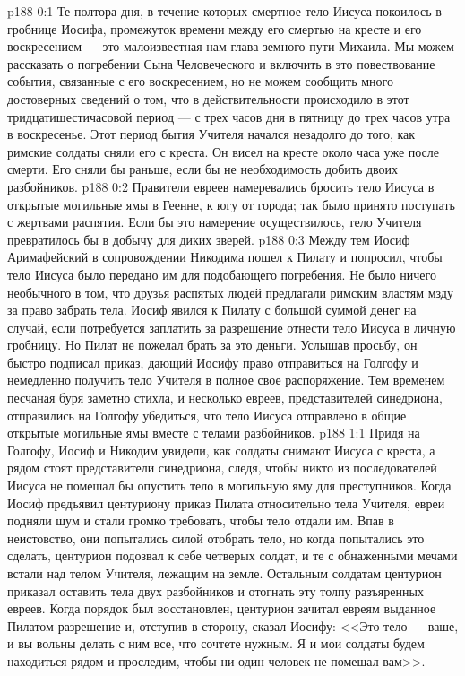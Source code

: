 \vs p188 0:1 Те полтора дня, в течение которых смертное тело Иисуса покоилось в гробнице Иосифа, промежуток времени между его смертью на кресте и его воскресением --- это малоизвестная нам глава земного пути Михаила. Мы можем рассказать о погребении Сына Человеческого и включить в это повествование события, связанные с его воскресением, но не можем сообщить много достоверных сведений о том, что в действительности происходило в этот тридцатишестичасовой период --- с трех часов дня в пятницу до трех часов утра в воскресенье. Этот период бытия Учителя начался незадолго до того, как римские солдаты сняли его с креста. Он висел на кресте около часа уже после смерти. Его сняли бы раньше, если бы не необходимость добить двоих разбойников.
\vs p188 0:2 Правители евреев намеревались бросить тело Иисуса в открытые могильные ямы в Геенне, к югу от города; так было принято поступать с жертвами распятия. Если бы это намерение осуществилось, тело Учителя превратилось бы в добычу для диких зверей.
\vs p188 0:3 Между тем Иосиф Аримафейский в сопровождении Никодима пошел к Пилату и попросил, чтобы тело Иисуса было передано им для подобающего погребения. Не было ничего необычного в том, что друзья распятых людей предлагали римским властям мзду за право забрать тела. Иосиф явился к Пилату с большой суммой денег на случай, если потребуется заплатить за разрешение отнести тело Иисуса в личную гробницу. Но Пилат не пожелал брать за это деньги. Услышав просьбу, он быстро подписал приказ, дающий Иосифу право отправиться на Голгофу и немедленно получить тело Учителя в полное свое распоряжение. Тем временем песчаная буря заметно стихла, и несколько евреев, представителей синедриона, отправились на Голгофу убедиться, что тело Иисуса отправлено в общие открытые могильные ямы вместе с телами разбойников.
\vs p188 1:1 Придя на Голгофу, Иосиф и Никодим увидели, как солдаты снимают Иисуса с креста, а рядом стоят представители синедриона, следя, чтобы никто из последователей Иисуса не помешал бы опустить тело в могильную яму для преступников. Когда Иосиф предъявил центуриону приказ Пилата относительно тела Учителя, евреи подняли шум и стали громко требовать, чтобы тело отдали им. Впав в неистовство, они попытались силой отобрать тело, но когда попытались это сделать, центурион подозвал к себе четверых солдат, и те с обнаженными мечами встали над телом Учителя, лежащим на земле. Остальным солдатам центурион приказал оставить тела двух разбойников и отогнать эту толпу разъяренных евреев. Когда порядок был восстановлен, центурион зачитал евреям выданное Пилатом разрешение и, отступив в сторону, сказал Иосифу: <<Это тело --- ваше, и вы вольны делать с ним все, что сочтете нужным. Я и мои солдаты будем находиться рядом и проследим, чтобы ни один человек не помешал вам>>.
